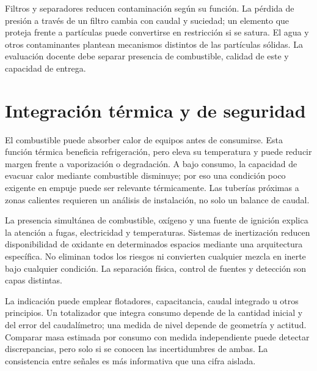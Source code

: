 Filtros y separadores reducen contaminación según su función. La pérdida de presión a través de un filtro cambia con caudal y suciedad; un elemento que proteja frente a partículas puede convertirse en restricción si se satura. El agua y otros contaminantes plantean mecanismos distintos de las partículas sólidas. La evaluación docente debe separar presencia de combustible, calidad de este y capacidad de entrega.

\section{Integración térmica y de seguridad}
El combustible puede absorber calor de equipos antes de consumirse. Esta función térmica beneficia refrigeración, pero eleva su temperatura y puede reducir margen frente a vaporización o degradación. A bajo consumo, la capacidad de evacuar calor mediante combustible disminuye; por eso una condición poco exigente en empuje puede ser relevante térmicamente. Las tuberías próximas a zonas calientes requieren un análisis de instalación, no solo un balance de caudal.

La presencia simultánea de combustible, oxígeno y una fuente de ignición explica la atención a fugas, electricidad y temperaturas. Sistemas de inertización reducen disponibilidad de oxidante en determinados espacios mediante una arquitectura específica. No eliminan todos los riesgos ni convierten cualquier mezcla en inerte bajo cualquier condición. La separación física, control de fuentes y detección son capas distintas.

La indicación puede emplear flotadores, capacitancia, caudal integrado u otros principios. Un totalizador que integra consumo depende de la cantidad inicial y del error del caudalímetro; una medida de nivel depende de geometría y actitud. Comparar masa estimada por consumo con medida independiente puede detectar discrepancias, pero solo si se conocen las incertidumbres de ambas. La consistencia entre señales es más informativa que una cifra aislada.

